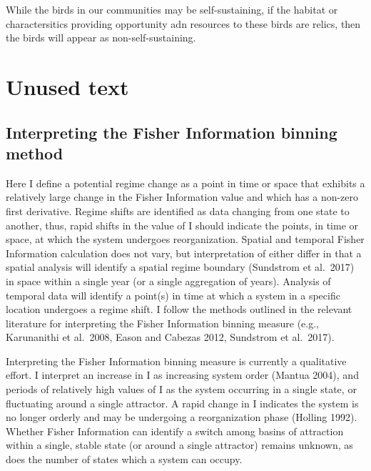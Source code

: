 \documentclass[12pt,twoside,openany]{reedthesis}
\begin{document}
While the birds in our communities may be self-sustaining, if the habitat or charactersitics providing opportunity adn resources to these birds are relics, then the birds will appear as non-self-sustaining.

\hypertarget{unused-text}{%
\section{Unused text}\label{unused-text}}

\hypertarget{interpreting-the-fisher-information-binning-method}{%
\subsection{Interpreting the Fisher Information binning method}\label{interpreting-the-fisher-information-binning-method}}

Here I define a potential regime change as a point in time or space that exhibits a relatively large change in the Fisher Information value and which has a non-zero first derivative. Regime shifts are identified as data changing from one state to another, thus, rapid shifts in the value of I should indicate the points, in time or space, at which the system undergoes reorganization. Spatial and temporal Fisher Information calculation does not vary, but interpretation of either differ in that a spatial analysis will identify a spatial regime boundary (Sundstrom et al.~2017) in space within a single year (or a single aggregation of years). Analysis of temporal data will identify a point(s) in time at which a system in a specific location undergoes a regime shift. I follow the methods outlined in the relevant literature for interpreting the Fisher Information binning measure (e.g., Karunanithi et al.~2008, Eason and Cabezas 2012, Sundstrom et al.~2017).

Interpreting the Fisher Information binning measure is currently a qualitative effort. I interpret an increase in I as increasing system order (Mantua 2004), and periods of relatively high values of I as the system occurring in a single state, or fluctuating around a single attractor. A rapid change in I indicates the system is no longer orderly and may be undergoing a reorganization phase (Holling 1992). Whether Fisher Information can identify a switch among basins of attraction within a single, stable state (or around a single attractor) remains unknown, as does the number of states which a system can occupy.
\end{document}
